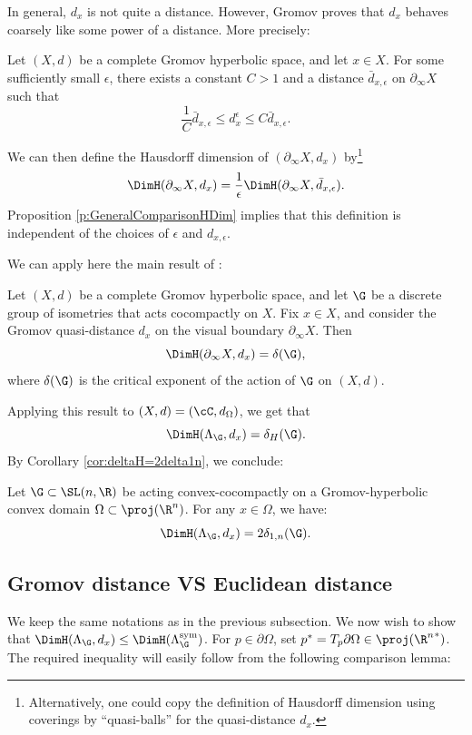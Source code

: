 In general, $d_x$ is not quite a distance. However, Gromov proves that $d_x$ behaves coarsely like some power of a distance. More precisely:
\begin{prop}[Gromov] Let $(X,d)$ be a complete Gromov hyperbolic space, and let $x\in X$. For some sufficiently small $\epsilon$, there exists a constant $C>1$ and a distance $\bar d_{x,\epsilon}$ on $\partial_\infty X$ such that
\[\frac{1}{C} \bar d_{x,\epsilon} \leq d_x^\epsilon \leq C \bar d_{x,\epsilon}.\]
\end{prop}
We can then define the Hausdorff dimension of $(\partial_\infty X, d_x)$ by\footnote{Alternatively, one could copy the definition of Hausdorff dimension using coverings by ``quasi-balls'' for the quasi-distance $d_x$.}
\[\DimH(\partial_\infty X, d_x) = \frac{1}{\epsilon} \DimH(\partial_\infty X, \bar d_{x,\epsilon}).\]
Proposition \ref{p:GeneralComparisonHDim} implies that this definition is independent of the choices of $\epsilon$ and $d_{x,\epsilon}$.

We can apply here the main result of \cite{Coornaert}:

\begin{theorem} \label{theo - coornaert}
Let $(X,d)$ be a complete Gromov hyperbolic space, and let $\G$ be a discrete group of isometries that acts cocompactly on $X$. Fix $x\in X$, and consider the Gromov quasi-distance $d_x$ on the visual boundary $\partial_\infty X$. Then \[\DimH(\partial_\infty X,d_x)= \delta(\G),\] where $\delta(\G)$ is the critical exponent of the action of $\G$ on $(X,d)$.
\end{theorem}
Applying this result to $(X,d)=(\cC,d_\Omega)$, we get that \[\DimH(\Lambda_\G,d_x)=\delta_H(\G).\] By Corollary \ref{cor:deltaH=2delta1n}, we conclude:

\begin{prop} \label{prop - dimension Gromov = exposant critique} Let $\G\subset \SL(n,\R)$ be acting convex-cocompactly on a Gromov-hyperbolic convex domain $\Omega\subset\proj(\R^n)$. For any $x\in \Omega$, we have:
\[ \DimH(\Lambda_\G,d_x)=2\delta_{1,n}(\G).\]
\end{prop}

\subsection{Gromov distance VS Euclidean distance}

We keep the same notations as in the previous subsection. We now wish to show that $\DimH(\Lambda_\G,d_x)\leq \DimH(\Lambda_\G^{\mathrm{sym}})$. For $p\in \partial \Omega$, set $p^*=T_p\partial\Omega \in \proj({\R^n}^*)$. The required inequality will easily follow from the following comparison lemma:

